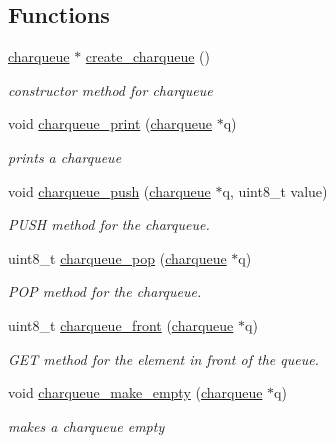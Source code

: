\subsection*{Functions}
\begin{DoxyCompactItemize}
\item 
\hyperlink{structcharqueue}{charqueue} $\ast$ \hyperlink{group__Queue_ga44a11e67ef5807557628f7c6a0767289}{create\+\_\+charqueue} ()
\begin{DoxyCompactList}\small\item\em constructor method for charqueue \end{DoxyCompactList}\item 
void \hyperlink{group__Queue_ga0ea8507c596fb50285773fd50f0a818d}{charqueue\+\_\+print} (\hyperlink{structcharqueue}{charqueue} $\ast$q)
\begin{DoxyCompactList}\small\item\em prints a charqueue \end{DoxyCompactList}\item 
void \hyperlink{group__Queue_gab21c584ab513656ce228be8faf43072b}{charqueue\+\_\+push} (\hyperlink{structcharqueue}{charqueue} $\ast$q, uint8\+\_\+t value)
\begin{DoxyCompactList}\small\item\em P\+U\+SH method for the charqueue. \end{DoxyCompactList}\item 
uint8\+\_\+t \hyperlink{group__Queue_gacdaded4e5bcc6ae01a6d789985381553}{charqueue\+\_\+pop} (\hyperlink{structcharqueue}{charqueue} $\ast$q)
\begin{DoxyCompactList}\small\item\em P\+OP method for the charqueue. \end{DoxyCompactList}\item 
uint8\+\_\+t \hyperlink{group__Queue_gacaa29ccb78b3a91fc2cc5feff22750da}{charqueue\+\_\+front} (\hyperlink{structcharqueue}{charqueue} $\ast$q)
\begin{DoxyCompactList}\small\item\em G\+ET method for the element in front of the queue. \end{DoxyCompactList}\item 
void \hyperlink{group__Queue_ga4c29bcf6ba2eca0528b3ac7889361b3f}{charqueue\+\_\+make\+\_\+empty} (\hyperlink{structcharqueue}{charqueue} $\ast$q)
\begin{DoxyCompactList}\small\item\em makes a charqueue empty \end{DoxyCompactList}\item 

\end{DoxyCompactItemize}
